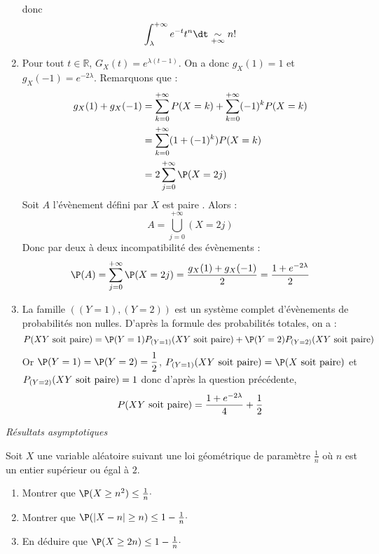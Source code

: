 \documentclass[a4paper,10pt]{report}
\begin{document}
\begin{enumerate}
donc 
$$  \int_{\lambda}^{+ \infty} e^{-t} t^n \dt \underset{+ \infty}{\sim} n! $$
\item Pour tout $t \in \mathbb{R}$, $G_X(t) = e^{\lambda (t-1)}$. On a donc $g_X(1)=1$ et $g_X(-1)=e^{-2 \lambda}$. Remarquons que :
\begin{align*}
g_X(1) + g_X(-1) & = \sum_{k=0}^{+ \infty} P(X=k)  + \sum_{k=0}^{+ \infty} (-1)^k P(X=k)  \\
& = \sum_{k=0}^{+ \infty} (1+(-1)^k) P(X=k)  \\
& = 2 \sum_{j=0}^{+ \infty} \P(X=2j)
\end{align*}
Soit $A$ l'évènement défini par \og $X$ est paire \fg. Alors :
$$ A = \bigcup_{j=0}^{+ \infty} (X=2j)$$
Donc par deux à deux incompatibilité des évènements :
$$ \P(A) = \sum_{j=0}^{+ \infty} \P(X=2j) = \dfrac{g_X(1) +g_X(-1)}{2} = \dfrac{1+e^{-2\lambda}}{2}$$
\item La famille $((Y=1), (Y=2))$ est un système complet d'évènements de probabilités non nulles. D'après la formule des probabilités totales, on a :
$$ P(XY \hbox{ soit paire}) = \P(Y=1)P_{(Y=1)}(XY \hbox{ soit paire}) + \P(Y=2)P_{(Y=2)}(XY \hbox{ soit paire})$$
Or $\P(Y=1)= \P(Y=2) = \dfrac{1}{2}$, $P_{(Y=1)}(XY \hbox{ soit paire}) = \P(X \hbox{ soit paire})$ et $P_{(Y=2)}(XY \hbox{ soit paire}) = 1$ donc d'après la question précédente,
$$ P(XY \hbox{ soit paire}) = \dfrac{1+e^{-2\lambda}}{4} + \dfrac{1}{2}$$

\end{enumerate}

\medskip

\begin{center}
\textit{{ {\large Résultats asymptotiques}}}
\end{center}

\medskip

\begin{Exa} Soit $X$ une variable aléatoire suivant une loi géométrique de paramètre $\tfrac{1}{n}$ où $n$ est un entier supérieur ou égal à $2$.

\begin{enumerate}
\item Montrer que $\P(X \geq n^2) \leq \tfrac{1}{n}\cdot$
\item Montrer que $\P(\vert X-n \vert  \geq n ) \leq 1 - \tfrac{1}{n} \cdot$
\item En déduire que $\P(X \geq 2n) \leq 1 - \tfrac{1}{n} \cdot$
\end{enumerate}
\end{Exa}
\end{document}
